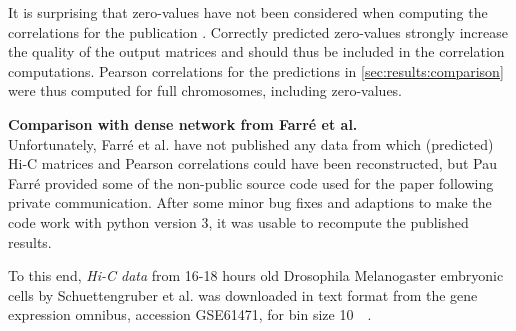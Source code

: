 It is surprising that zero-values have not been considered when computing the correlations for the publication \cite{Zhang2019}.
Correctly predicted zero-values strongly increase the quality of the output matrices 
and should thus be included in the correlation computations.
Pearson correlations for the predictions in \cref{sec:results:comparison} were thus computed for full chromosomes, including zero-values.

\textbf{Comparison with dense network from Farr\'e et al.}\\
Unfortunately, Farr\'e et al. have not published any data from which (predicted) Hi-C matrices and Pearson correlations could have been reconstructed,
but Pau Farr\'e provided some of the non-public source code used for the paper \cite{Farre2018a} following private communication.
After some minor bug fixes and adaptions to make the code work with python version 3, it was usable to recompute the published results.

To this end, \emph{Hi-C data} from 16-18 hours old Drosophila Melanogaster embryonic cells by Schuettengruber et al. \cite{Schuettengruber2014} 
was downloaded in text format from  the gene expression omnibus, accession GSE61471, for bin size \SI{10}{\kilo\bp}.

